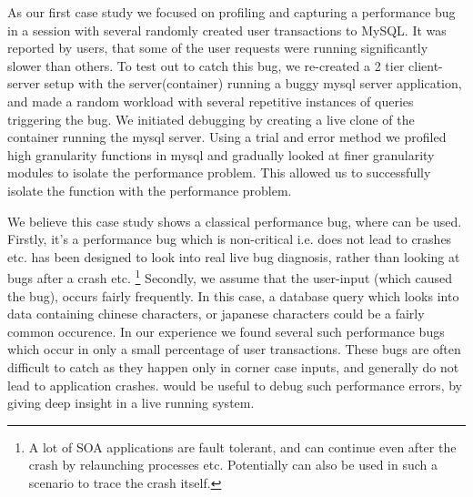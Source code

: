 As our first case study we focused on profiling and capturing a performance bug in a session with several randomly created user transactions to MySQL. 
It was reported by users, that some of the user requests were running significantly slower than others.
To test out \parikshan to catch this bug, we re-created a 2 tier client-server setup with the server(container) running a buggy mysql server application, and made a random workload with several repetitive instances of queries triggering the bug.
We initiated debugging by creating a live clone of the container running the mysql server.
Using a trial and error method we profiled high granularity functions in mysql and gradually looked at finer granularity modules to isolate the performance problem.
This allowed us to successfully isolate the function with the performance problem.

We believe this case study shows a classical performance bug, where \parikshan can be used.
Firstly, it's a performance bug which is non-critical i.e. does not lead to crashes etc.
\parikshan has been designed to look into real live bug diagnosis, rather than looking at bugs after a crash etc.
\footnote{A lot of SOA applications are fault tolerant, and can continue even after the crash by relaunching processes etc. Potentially \parikshan can also be used in such a scenario to trace the crash itself.}
Secondly, we assume that the user-input (which caused the bug), occurs fairly frequently.
In this case, a database query which looks into data containing chinese characters, or japanese characters could be a fairly common occurence.
In our experience we found several such performance bugs which occur in only a small percentage of user transactions.
These bugs are often difficult to catch as they happen only in corner case inputs, and generally do not lead to application crashes.
\parikshan would be useful to debug such performance errors, by giving deep insight in a live running system.



